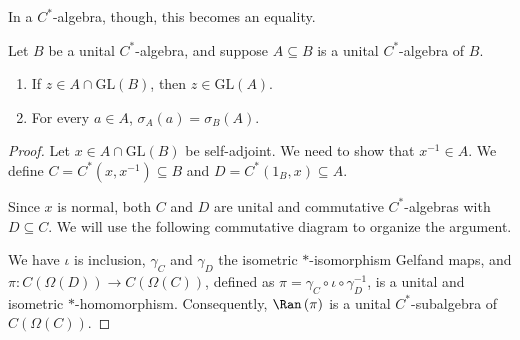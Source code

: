 \documentclass[10pt]{mypackage}
\newcommand{\GL}{\text{GL}}
\begin{document}
In a $C^{\ast}$-algebra, though, this becomes an equality.
\begin{proposition}
Let $B$ be a unital $C^{\ast}$-algebra, and suppose $A\subseteq B$ is a unital $C^{\ast}$-algebra of $B$.
\begin{enumerate}[(1)]
  \item If $z\in A\cap \GL\left(B\right)$, then $z\in \GL\left(A\right)$.
  \item For every $a\in A$, $\sigma_A\left(a\right) = \sigma_B\left(A\right)$.
\end{enumerate}
\end{proposition}
\begin{proof}
  Let $x\in A\cap \GL\left(B\right)$ be self-adjoint. We need to show that $x^{-1}\in A$. We define $C = C^{\ast}\left(x,x^{-1}\right)\subseteq B$ and $D = C^{\ast}\left(1_B,x\right)\subseteq A$.\newline

  Since $x$ is normal, both $C$ and $D$ are unital and commutative $C^{\ast}$-algebras with $D\subseteq C$. We will use the following commutative diagram to organize the argument.
  \begin{center}
  \end{center}
  We have $\iota$ is inclusion, $\gamma_C$ and $\gamma_D$ the isometric $\ast$-isomorphism Gelfand maps, and $\pi\colon C\left(\Omega\left(D\right)\right)\rightarrow C\left(\Omega\left(C\right)\right)$, defined as $\pi = \gamma_C\circ \iota \circ \gamma_D^{-1}$, is a unital and isometric $\ast$-homomorphism. Consequently, $\Ran\left(\pi\right)$ is a unital $C^{\ast}$-subalgebra of $C\left(\Omega\left(C\right)\right)$.\newline


\end{proof}
\end{document}
